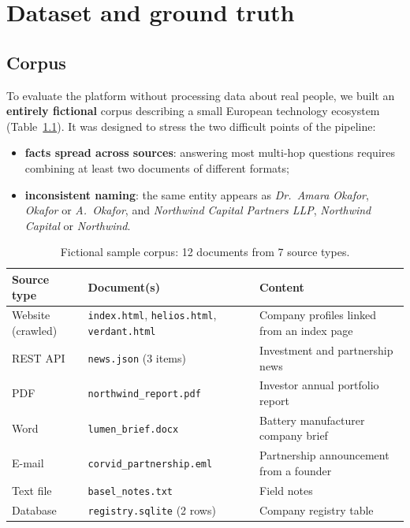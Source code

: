 \documentclass[11pt,a4paper]{report}
\begin{document}
\chapter{Dataset and ground truth}\label{ch:data}

\section{Corpus}
To evaluate the platform without processing data about real people, we built an \textbf{entirely fictional} corpus
describing a small European technology ecosystem (Table~\ref{tab:corpus}). It was designed to stress the two
difficult points of the pipeline:
\begin{itemize}
  \item \textbf{facts spread across sources}: answering most multi-hop questions requires combining at least two
        documents of different formats;
  \item \textbf{inconsistent naming}: the same entity appears as \emph{Dr.\ Amara Okafor}, \emph{Okafor} or
        \emph{A.\ Okafor}, and \emph{Northwind Capital Partners LLP}, \emph{Northwind Capital} or \emph{Northwind}.
\end{itemize}

\begin{table}[ht]
\centering
\small
\begin{tabularx}{\linewidth}{llX}
\toprule
\textbf{Source type} & \textbf{Document(s)} & \textbf{Content} \\
\midrule
Website (crawled) & \texttt{index.html}, \texttt{helios.html}, \texttt{verdant.html} & Company profiles linked from an index page \\
REST API & \texttt{news.json} (3 items) & Investment and partnership news \\
PDF & \texttt{northwind\_report.pdf} & Investor annual portfolio report \\
Word & \texttt{lumen\_brief.docx} & Battery manufacturer company brief \\
E-mail & \texttt{corvid\_partnership.eml} & Partnership announcement from a founder \\
Text file & \texttt{basel\_notes.txt} & Field notes \\
Database & \texttt{registry.sqlite} (2 rows) & Company registry table \\
\bottomrule
\end{tabularx}
\caption{Fictional sample corpus: 12 documents from 7 source types.}
\label{tab:corpus}
\end{table}
\end{document}
